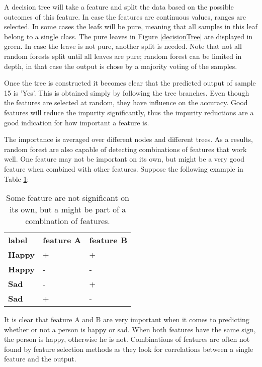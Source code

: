 A decision tree will take a feature and split the data based on the possible outcomes of this feature. In case the features are continuous values, ranges are selected. In some cases the leafs will be pure, meaning that all samples in this leaf belong to a single class. The pure leaves in Figure \ref{decisionTree} are displayed in green. In case the leave is not pure, another split is needed. Note that not all random forests split until all leaves are pure; random forest can be limited in depth, in that case the output is chose by a majority voting of the samples.


\clearpage

Once the tree is constructed it becomes clear that the predicted output of sample 15 is 'Yes'. This is obtained simply by following the tree branches. Even though the features are selected at random, they have influence on the accuracy. Good features will reduce the impurity significantly, thus the impurity reductions are a good indication for how important a feature is.

\npar

The importance is averaged over different nodes and different trees. As a results, random forest are also capable of detecting combinations of features that work well. One feature may not be important on its own, but might be a very good feature when combined with other features. Suppose the following example in Table \ref{featPair}:

\begin{table}[H]
\centering
\caption{Some feature are not significant on its own, but a might be part of a combination of features.\label{featPair}}
\begin{tabular}{lll}
\textbf{label} & \textbf{feature A} & \textbf{feature B} \\
\textbf{Happy} & +                  & +                  \\
\textbf{Happy} & -                  & -                  \\
\textbf{Sad}   & -                  & +                  \\
\textbf{Sad}   & +                  & -                 
\end{tabular}
\end{table}

It is clear that feature A and B are very important when it comes to predicting whether or not a person is happy or sad. When both features have the same sign, the person is happy, otherwise he is not. Combinations of features are often not found by feature selection methods as they look for correlations between a single feature and the output.

